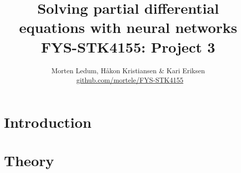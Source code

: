 \documentclass[a4paper, twocolumn]{article}
\title{{\sc Solving partial differential equations with neural networks \\ {\large FYS-STK4155: Project 3}}}
\author{Morten Ledum, Håkon Kristiansen \& Kari Eriksen \\ \faGithub \ {\small \href{https://github.com/mortele/FYS-STK4155/tree/master/project3}{github.com/mortele/FYS-STK4155}}}
\begin{document}
\onecolumn
\maketitle

\begin{abstract}
\lipsum[1]
\end{abstract}

\twocolumn
\onecolumn

\tableofcontents 
\twocolumn


\section{Introduction}
\lipsum[1]

\section{Theory}
\lipsum[2]
\end{document}
